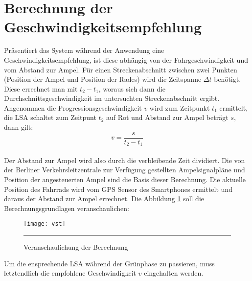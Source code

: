 \section{\label{sec:mathGrundlagen}Berechnung der Geschwindigkeitsempfehlung}
Präsentiert das System während der Anwendung eine Geschwindigkeitsempfehlung, ist diese abhängig von der Fahrgeschwindigkeit und vom Abstand zur Ampel. Für einen Streckenabschnitt zwischen zwei Punkten (Position der Ampel und Position der Rades) wird die Zeitspanne $\Delta t$ benötigt. Diese errechnet man mit $t_{2} - t_{1}$, woraus sich dann die Durchschnittsgeschwindigkeit im untersuchten Streckenabschnitt ergibt.\\ 
Angenommen die Progressionsgeschwindigkeit $v$ wird zum Zeitpunkt $t_{1}$ ermittelt, die \gls {LSA} schaltet zum Zeitpunt $t_{2}$ auf Rot und Abstand zur Ampel beträgt $s$, dann gilt: \\
\[ v = \frac{s}{t_{2} - t_{1}} \] \\
Der Abstand zur Ampel wird also durch die verbleibende Zeit dividiert. 
Die von der Berliner Verkehrsleitzentrale zur Verfügung gestellten Ampelsignalpläne und Position der angesteuerten Ampel sind die Basis dieser Berechnung. Die aktuelle Position des Fahrrads wird vom \gls{GPS} Sensor des \glspl{Smartphone} ermittelt und daraus der Abstand zur Ampel errechnet. Die Abbildung \ref{fig:vst} soll die Berechnungsgrundlagen veranschaulichen: 
\begin{figure}[H]  
    \centering  
    \texttt{[image: vst]}  
    \rule{35em}{0.5pt}   
    \caption[Berechnung Progressionsgeschwindigkeit]{Veranschaulichung der Berechnung}
    \label{fig:vst}
\end{figure}
Um die ensprechende \gls{LSA} während der Grünphase zu passieren, muss letztendlich die empfohlene Geschwindigkeit $v$ eingehalten werden.
